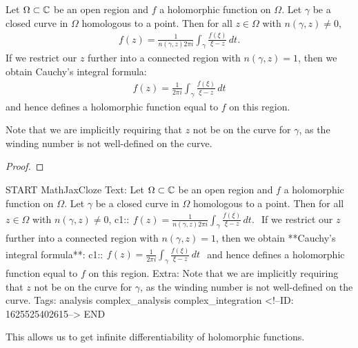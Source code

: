 \documentclass{memoir}
\begin{document}
\begin{thm}
	Let \(\Omega \subset \mathbb{C}\) be an open region and \(f\) a holomorphic function on \(\Omega \). Let \(\gamma \) be a closed curve in \(\Omega \) homologous to a point. Then for all \(z \in \Omega \) with \(n(\gamma ,z)\neq 0\),
	\begin{align*}
		f(z) = \frac{1}{n(\gamma,z)2\pi i} \int_\gamma \frac{f(\xi )}{\xi -z}\,d t.
	\end{align*}
	If we restrict our \(z\) further into a connected region with \(n(\gamma ,z)=1\), then we obtain Cauchy's integral formula:
	\begin{align*}
		f(z) = \frac{1}{2\pi i} \int_\gamma \frac{f(\xi )}{\xi -z}\,d t
	\end{align*}
	and hence defines a holomorphic function equal to \(f\) on this region.
\end{thm}
Note that we are implicitly requiring that \(z\) not be on the curve for \(\gamma \), as the winding number is not well-defined on the curve.

\begin{proof}%
	
\end{proof}

\begin{anki}
START
MathJaxCloze
Text: Let \(\Omega \subset \mathbb{C}\) be an open region and \(f\) a holomorphic function on \(\Omega \). Let \(\gamma \) be a closed curve in \(\Omega \) homologous to a point. Then for all \(z \in \Omega \) with \(n(\gamma ,z)\neq 0\),
{{c1::\(\begin{align*}
f(z) = \frac{1}{n(\gamma,z)2\pi i} \int_\gamma \frac{f(\xi )}{\xi -z}\,d t.
\end{align*}\)}} 
If we restrict our \(z\) further into a connected region with \(n(\gamma ,z)=1\), then we obtain **Cauchy's integral formula**:
{{c1::\(\begin{align*}
	f(z) = \frac{1}{2\pi i} \int_\gamma \frac{f(\xi )}{\xi -z}\,d t
\end{align*}\)}}
and hence defines a holomorphic function equal to \(f\) on this region.
Extra: Note that we are implicitly requiring that \(z\) not be on the curve for \(\gamma \), as the winding number is not well-defined on the curve.
Tags: analysis complex_analysis complex_integration
<!--ID: 1625525402615-->
END
\end{anki}

This allows us to get infinite differentiability of holomorphic functions.
\end{document}
